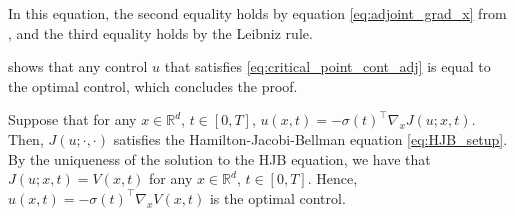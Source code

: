     In this equation, the second equality holds by equation \eqref{eq:adjoint_grad_x} from , and the third equality holds by the Leibniz rule.
    
     shows that any control $u$ that satisfies \eqref{eq:critical_point_cont_adj} is equal to the optimal control, which concludes the proof. 

\begin{lemma} \label{eq:lemma_cost_functional}
    Suppose that for any $x \in \mathbb{R}^d$, $t \in [0,T]$, $u(x,t) = - \sigma(t)^{\top} \nabla_x J(u;x,t)$. Then, $J(u;\cdot,\cdot)$ satisfies the Hamilton-Jacobi-Bellman equation \eqref{eq:HJB_setup}. By the uniqueness of the solution to the HJB equation, we have that $J(u;x,t) = V(x,t)$ for any $x \in \mathbb{R}^d$, $t \in [0,T]$. Hence, $u(x,t) = - \sigma(t)^{\top} \nabla_x V(x,t)$ is the optimal control.
\end{lemma}
